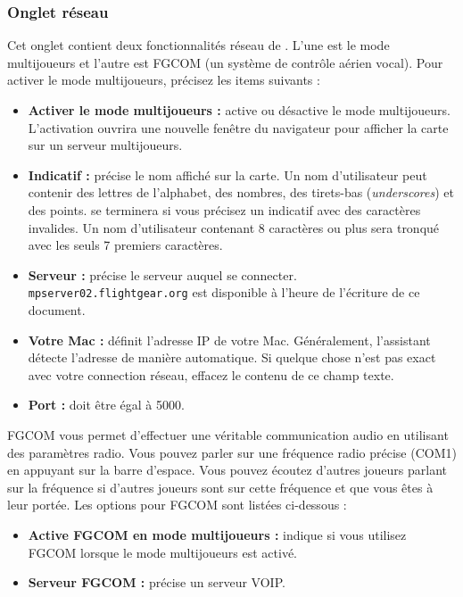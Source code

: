 {{\subsubsection{Onglet r\'{e}seau}
Cet onglet contient deux fonctionnalit\'{e}s r\'{e}seau de \FlightGear{}. L'une est le mode multijoueurs et l'autre est FGCOM (un syst\`{e}me de contr\^{o}le a\'{e}rien vocal). Pour activer le mode multijoueurs, pr\'{e}cisez les items suivants :
\begin{itemize}
\item \textbf{Activer le mode multijoueurs :} active ou d\'{e}sactive le mode multijoueurs. L'activation ouvrira une nouvelle fen\^{e}tre du navigateur pour afficher la carte sur un serveur multijoueurs.
\item \textbf{Indicatif :} pr\'{e}cise le nom affich\'{e} sur la carte. Un nom d'utilisateur peut contenir des lettres de l'alphabet, des nombres, des tirets-bas (\textit{underscores}) et des points. \FlightGear{} se terminera si vous pr\'{e}cisez un indicatif avec des caract\`{e}res invalides. Un nom d'utilisateur contenant 8 caract\`{e}res ou plus sera tronqu\'{e} avec les seuls 7 premiers caract\`{e}res. 
\item \textbf{Serveur :} pr\'{e}cise le serveur auquel se connecter. \texttt{mpserver02.flightgear.org} est disponible \`{a} l'heure de l'\'{e}criture de ce document.
\item \textbf{Votre Mac :} d\'{e}finit l'adresse IP de votre Mac. G\'{e}n\'{e}ralement, l'assistant d\'{e}tecte l'adresse de mani\`{e}re automatique. Si quelque chose n'est pas exact avec votre connection r\'{e}seau, effacez le contenu de ce champ texte.
\item \textbf{Port :} doit \^{e}tre \'{e}gal \`{a} 5000.
\end{itemize}

FGCOM vous permet d'effectuer une v\'{e}ritable communication audio en utilisant des param\`{e}tres radio. Vous pouvez parler sur une fr\'{e}quence radio pr\'{e}cise (COM1) en appuyant sur la barre d'espace. Vous pouvez \'{e}coutez d'autres joueurs parlant sur la fr\'{e}quence si d'autres joueurs sont sur cette fr\'{e}quence et que vous \^{e}tes \`{a} leur port\'{e}e. Les options pour FGCOM sont list\'{e}es ci-dessous :

\begin{itemize}
\item \textbf{Active FGCOM en mode multijoueurs :} indique si vous utilisez FGCOM lorsque le mode multijoueurs est activ\'{e}.
\item \textbf{Serveur FGCOM :} pr\'{e}cise un serveur VOIP.
\end{itemize}

}}
